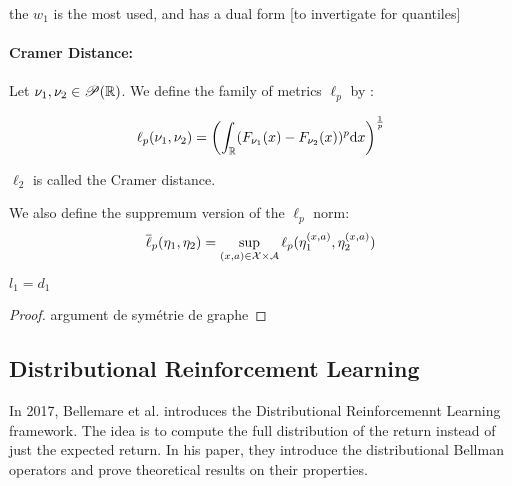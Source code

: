 the $w_1$ is the most used, and has a dual form [to invertigate for quantiles]

\paragraph{Cramer Distance:}

\begin{definition}
    Let $\nu_1, \nu_2 \in \mathscr{P}(\mathbb{R})$. We define the family of metrics $\ell_p$ by :

    \[ \ell_p(\nu_1, \nu_2) = \left( \int_{\mathbb{R}} (F_{\nu_1}(x) - F_{\nu_2}(x))^p \mathrm{d} x\right)^{\frac{1}{p}} \]

    $\ell_2$ is called the Cramer distance.

    We also define the suppremum version of the $\ell_p$ norm:
    \[ \overline{\ell}_p(\eta_1,\eta_2) = \sup_{(x,a) \in \mathcal{X} \times \mathcal{A}} \ell_p(\eta_1^{(x,a)}, \eta_2^{(x,a)})\]
\end{definition}

\begin{remark}
    $l_1 = d_1$
\end{remark}
\begin{proof}
    argument de symétrie de graphe
\end{proof}



















\subsection{Distributional Reinforcement Learning}

In 2017, Bellemare et al. introduces the Distributional Reinforcemennt Learning framework. The idea is to compute the full distribution of the return instead of just the expected return. In his paper, they introduce the distributional Bellman operators and prove theoretical results on their properties.
\\%


